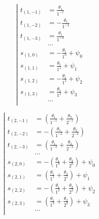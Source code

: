 \begin{equation*} \left| \begin{aligned}
t_{(1,-1)} &=
  \frac{\theta_1}{1^{-1}} \\
%
t_{(1,-2)} &=
  - \frac{\theta_1}{1^{-2}} \\
%
t_{(1,-3)} &=
  \frac{\theta_1}{1^{-3}} \\
%
&\ldots \\
%
s_{(1,0)} &=
- \frac{\theta_1}{1^0}
+ \psi_0 \\
%
s_{(1,1)} &=
  \frac{\theta_1}{1^1}
+ \psi_1 \\
%
s_{(1,2)} &=
- \frac{\theta_1}{1^2}
+ \psi_2 \\
%
s_{(1,3)} &=
  \frac{\theta_1}{1^3}
+ \psi_3 \\
%
&\ldots \\
\end{aligned} \right. \end{equation*}

\begin{equation*} \left| \begin{aligned}
t_{(2,-1)} &=
  \left(
  \frac{\theta_1}{1^{-1}}
+ \frac{\theta_2}{2^{-1}} \right) \\
%
t_{(2,-2)} &=
- \left(
  \frac{\theta_1}{1^{-2}}
+ \frac{\theta_2}{2^{-2}} \right) \\
%
t_{(2,-3)} &=
  \left(
  \frac{\theta_1}{1^{-3}}
+ \frac{\theta_2}{2^{-3}} \right) \\
%
&\ldots \\
%
s_{(2,0)} &=
- \left(
  \frac{\theta_1}{1^0}
+ \frac{\theta_2}{2^0} \right)
+ \psi_0 \\
%
s_{(2,1)} &=
  \left(
  \frac{\theta_1}{1^1}
+ \frac{\theta_2}{2^1} \right)
+ \psi_1 \\
%
s_{(2,2)} &=
- \left(
  \frac{\theta_1}{1^2}
+ \frac{\theta_2}{2^2} \right)
+ \psi_2 \\
%
s_{(2,3)} &=
  \left(
  \frac{\theta_1}{1^3}
+ \frac{\theta_2}{2^3} \right)
+ \psi_3 \\
%
&\ldots \\
\end{aligned} \right. \end{equation*}

